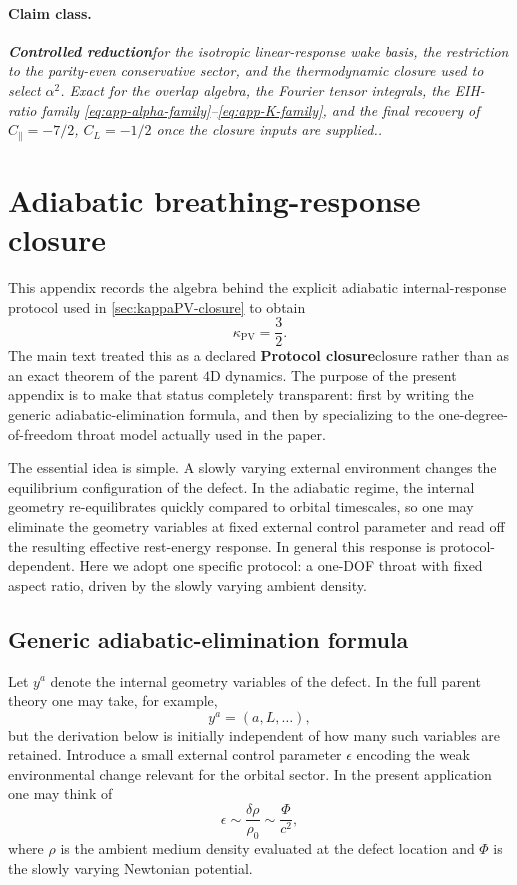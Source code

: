 \documentclass[11pt]{article}
\newcommand{\kPV}{\kappa_{\mathrm{PV}}}
\newcommand{\alphaSq}{\alpha^2}
\newcommand{\PhiN}{\Phi}
\newcommand{\Cpara}{C_{\parallel}}
\newcommand{\CLong}{C_{L}}
\newcommand{\Controlled}{\textbf{Controlled reduction}}
\newcommand{\Protocol}{\textbf{Protocol closure}}
\newcommand{\claimclass}[1]{\paragraph{Claim class.}\emph{#1.}}
\begin{document}
\claimclass{\Controlled for the isotropic linear-response wake basis, the restriction to
the parity-even conservative sector, and the thermodynamic closure used to select
\(\alphaSq\). Exact for the overlap algebra, the Fourier tensor integrals, the EIH-ratio
family \eqref{eq:app-alpha-family}--\eqref{eq:app-K-family}, and the final recovery of
\(\Cpara=-7/2\), \(\CLong=-1/2\) once the closure inputs are supplied.}

\section{Adiabatic breathing-response closure}
\label{app:adiabatic-closure}

This appendix records the algebra behind the explicit adiabatic internal-response protocol
used in \cref{sec:kappaPV-closure} to obtain
\begin{equation}
\kPV=\frac32.
\label{eq:app-kPV-target}
\end{equation}
The main text treated this as a declared \Protocol closure rather than as an exact theorem
of the parent \(4\)D dynamics. The purpose of the present appendix is to make that status
completely transparent: first by writing the generic adiabatic-elimination formula, and
then by specializing to the one-degree-of-freedom throat model actually used in the paper.

The essential idea is simple. A slowly varying external environment changes the
equilibrium configuration of the defect. In the adiabatic regime, the internal geometry
re-equilibrates quickly compared to orbital timescales, so one may eliminate the geometry
variables at fixed external control parameter and read off the resulting effective
rest-energy response. In general this response is protocol-dependent. Here we adopt one
specific protocol: a one-DOF throat with fixed aspect ratio, driven by the slowly varying
ambient density.

\subsection{Generic adiabatic-elimination formula}
\label{app:adiabatic-generic}

Let \(y^a\) denote the internal geometry variables of the defect. In the full parent
theory one may take, for example,
\begin{equation}
y^a=(a,L,\dots),
\end{equation}
but the derivation below is initially independent of how many such variables are retained.
Introduce a small external control parameter \(\epsilon\) encoding the weak environmental
change relevant for the orbital sector. In the present application one may think of
\begin{equation}
\epsilon \sim \frac{\delta\rho}{\rho_0} \sim \frac{\PhiN}{c^2},
\label{eq:app-epsilon-rho-phi}
\end{equation}
where \(\rho\) is the ambient medium density evaluated at the defect location and \(\PhiN\)
is the slowly varying Newtonian potential.
\end{document}

